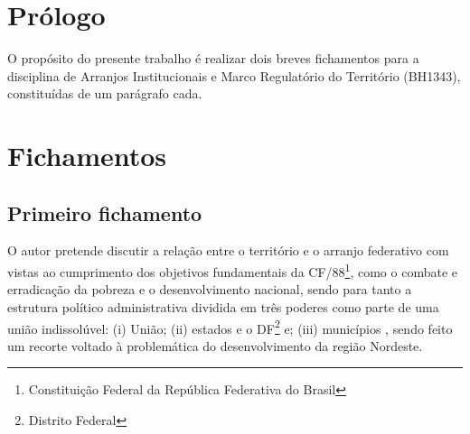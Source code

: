 \documentclass[
article,			%
11pt,				%
oneside,			%
a4paper,			%
english,			%
brazil,				%
sumario=tradicional
]{abntex2}
\begin{document}
	
	
	\frenchspacing 
	
	
	\maketitle
	

	\textual
	
	
	\section*{Prólogo}
	
	O propósito do presente trabalho é realizar dois breves fichamentos para a disciplina de Arranjos Institucionais e Marco Regulatório do Território (BH1343), constituídas de um parágrafo cada.
	
	\section{Fichamentos}
	
	\subsection{Primeiro fichamento}
	
	O autor pretende discutir a relação entre o território e o arranjo federativo com vistas ao cumprimento dos objetivos fundamentais da CF/88\footnote{Constituição Federal da República Federativa do Brasil}, como o combate e erradicação da pobreza e o desenvolvimento nacional, sendo para tanto a estrutura político administrativa dividida em três poderes como parte de uma união indissolúvel: (i) União; (ii) estados e o DF\footnote{Distrito Federal} e; (iii) municípios \cite[p. 89]{mendes2012}, sendo feito um recorte voltado à problemática do desenvolvimento da região Nordeste.
	
\end{document}
